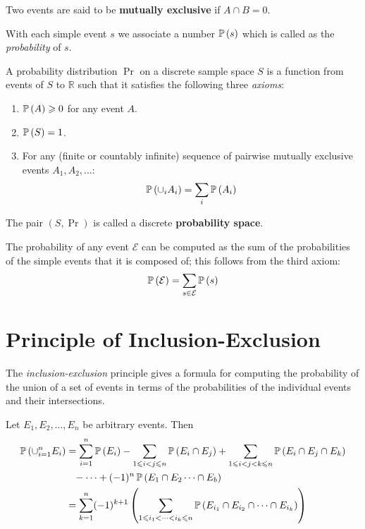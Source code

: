 Two events are said to be \textbf{mutually exclusive} if $A \cap B = 0$.

With each simple event $s$ we associate a number $\operatorname{\mathbb{P}}\left(s\right)$ which is
called as the \emph{probability} of $s$.

\begin{definition}
    A probability distribution $\Pr$ on a
    discrete sample space $S$ is a function from events of $S$ to $\mathbb{R}$
    such that it satisfies the following three \emph{axioms}:
    \begin{enumerate}
        \item $\operatorname{\mathbb{P}}\left(A\right) \geqslant 0$ for any event $A$.
        \item $\operatorname{\mathbb{P}}\left(S\right) = 1$.
        \item For any (finite or countably infinite)  sequence of pairwise mutually exclusive events
              $A_1, A_2, \dots$:
              \[\operatorname{\mathbb{P}}\left(\cup_i A_i\right) = \sum_i\operatorname{\mathbb{P}}\left(A_i\right)\]
    \end{enumerate}
    The pair $(S, \Pr)$ is called a discrete \textbf{probability space}.
\end{definition}

The probability of any event $\mathcal{E}$  can be computed as the sum of the probabilities of the simple events
that it is composed of; this follows from the third axiom:
\[\operatorname{\mathbb{P}}\left(\mathcal{E}\right) = \sum_{s\in\mathcal{E}} \operatorname{\mathbb{P}}\left(s\right)\]


\section{Principle of Inclusion-Exclusion}

The \emph{inclusion-exclusion} principle gives a formula for computing the probability
of the union of a set of events in terms of the probabilities of the individual events and their intersections.

\begin{theorem}
    Let $E_1,E_2, \dots, E_n$ be arbitrary events. Then
    \begin{align*}\operatorname{\mathbb{P}}\left(\cup_{i=1}^nE_i\right)
         & = \sum_{i=1}^n\operatorname{\mathbb{P}}\left(E_i\right) - \sum_{1 \leqslant i < j\leqslant n}\operatorname{\mathbb{P}}\left(E_i \cap E_j\right) + \sum_{1 \leqslant i < j < k \leqslant n}\operatorname{\mathbb{P}}\left(E_i \cap E_j \cap E_k\right) \\
         & \phantom{=} - \dots + (-1)^n\operatorname{\mathbb{P}}\left(E_1 \cap E_2 \dots \cap E_b\right)                                                                       \\
         & = \sum_{k=1}^n(-1)^{k+1}\left(\sum_{1\leqslant i_1<\dots<i_k\leqslant n}\operatorname{\mathbb{P}}\left(E_{i_1}\cap E_{i_2}\cap\dots\cap E_{i_k}\right)\right)
    \end{align*}
\end{theorem}

